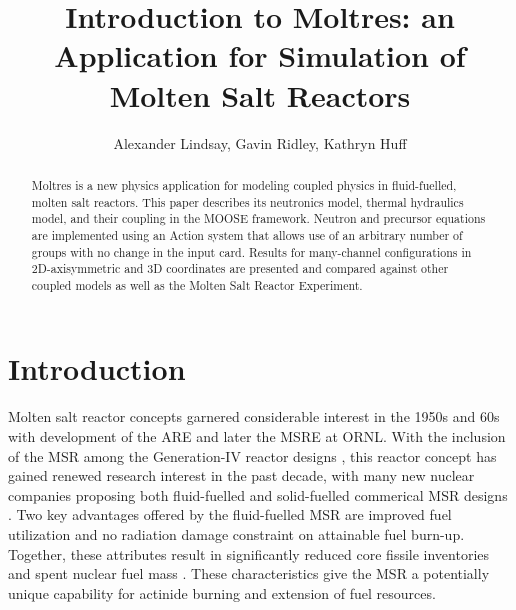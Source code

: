\documentclass{article}
\title{Introduction to Moltres: an Application for Simulation of Molten Salt Reactors}
\author{Alexander Lindsay, Gavin Ridley, Kathryn Huff}
\let\Oldsection\section
\renewcommand{\section}{\FloatBarrier\Oldsection}
\begin{document}
\maketitle

\begin{abstract}

Moltres is a new physics application for modeling coupled physics in 
fluid-fuelled, molten salt reactors. This paper describes its neutronics model, 
thermal hydraulics model, and their coupling in the MOOSE framework. Neutron 
and precursor equations are implemented using an Action system that allows use 
of an arbitrary number of groups with no change in the input card. Results for 
many-channel configurations in 2D-axisymmetric and 3D coordinates are presented 
and compared against other coupled models as well as the Molten Salt Reactor 
Experiment.

\end{abstract}

\section{Introduction}

Molten salt reactor concepts garnered considerable interest in the 1950s and 60s
with development of the \gls{ARE} and later the \gls{MSRE} at \gls{ORNL}.  With
the inclusion of the \gls{MSR} among the Generation-IV reactor designs
\cite{noauthor_gif_2015}, this reactor concept has gained renewed research
interest in the past decade, with many new nuclear companies proposing both
fluid-fuelled and solid-fuelled commerical \gls{MSR} designs
\cite{hyde_liquid_2015,leblanc_integral_2015,noauthor_-able_2017,scarlat_design_2014,noauthor_neutronics_2016}. Two
key advantages offered by the fluid-fuelled \gls{MSR} are improved fuel
utilization and no radiation damage constraint on attainable fuel
burn-up. Together, these attributes result in significantly reduced core fissile
inventories and spent nuclear fuel mass \cite{noauthor_gen_2008}.  These
characteristics give the \gls{MSR} a potentially unique capability for actinide
burning and extension of fuel resources.
\end{document}
